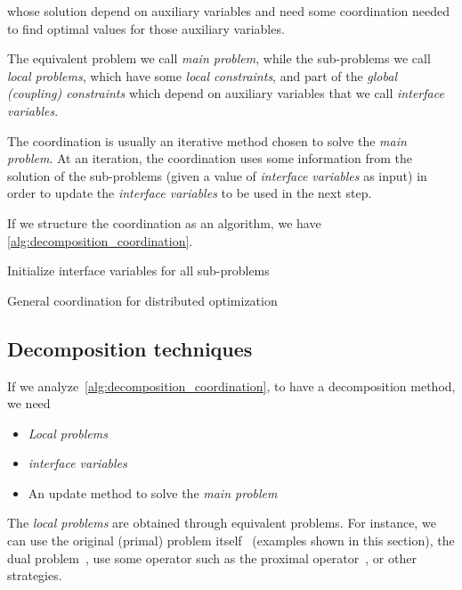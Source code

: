 \documentclass[../main.tex]{subfiles}
\begin{document}
whose solution depend on auxiliary variables and need some coordination needed to find optimal values for those auxiliary variables.

The equivalent problem we call \emph{main problem}, while the sub-problems we call \emph{local problems}, which have some \emph{local constraints}, and part of the \emph{global (coupling) constraints} which depend on auxiliary variables that we call \emph{interface variables}.

The coordination is usually an iterative method chosen to solve the \emph{main problem}.
At an iteration, the coordination uses some information from the solution of the sub-problems (given a value of \emph{interface variables} as input) in order to update the \emph{interface variables} to be used in the next step.

If we structure the coordination as an algorithm, we have \autoref{alg:decomposition_coordination}.

\begin{algorithm2e}[H]
  \DontPrintSemicolon%
  Initialize interface variables for all sub-problems\;
  \caption{General coordination for distributed optimization}\label{alg:decomposition_coordination}
\end{algorithm2e}

\subsection{Decomposition techniques}

If we analyze \autoref{alg:decomposition_coordination}, to have a decomposition method, we need
\begin{itemize}
  \item \emph{Local problems}
  \item \emph{interface variables}
  \item An update method to solve the \emph{main problem}
\end{itemize}

The \emph{local problems} are obtained through equivalent problems.
For instance, we can use the original (primal) problem itself~\cite{PaulenEtAl2016, CamisaEtAl2022} (examples shown in this section), the dual problem~\cite{MorosanEtAl2011, BourdaisEtAl2012,VelardeEtAl2018},  use some operator such as the proximal operator~\cite{Iiduka2019,OconnorVandenberghe2014}, or other strategies.
\end{document}
